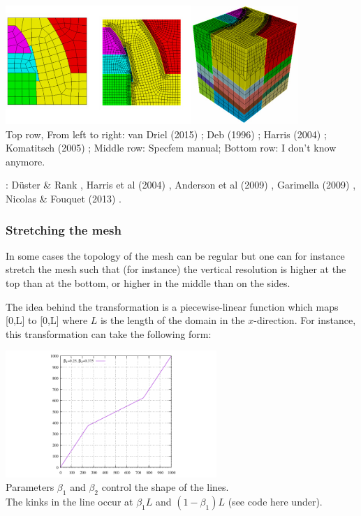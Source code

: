 \begin{center}
\includegraphics[height=4.5cm]{images/meshes/conf3D}\\
{\captionfont 
Top row, From left to right: 
van Driel \etal (2015) \cite{vaks15}; 
Deb \etal (1996) \cite{depl96}; 
Harris \etal (2004) \cite{habo04}; 
Komatitsch \etal (2005) \cite{kott05}; 
Middle row: Specfem manual;
Bottom row: I don't know anymore.}
\end{center}

\Literature: 
D{\"u}ster \& Rank \cite{dura01},
Harris et al (2004) \cite{habo04},
Anderson et al (2009) \cite{anbo09},
Garimella (2009) \cite{gari09},
Nicolas \& Fouquet (2013) \cite{nifo13,nifo13b}.

\subsubsection{Stretching the mesh}

In some cases the topology of the mesh can be regular but one can for instance stretch 
the mesh such that (for instance) the vertical resolution is higher at the top than at the bottom, 
or higher in the middle than on the sides.

The idea behind the transformation is a piecewise-linear function which maps [0,L] to [0,L] where 
$L$ is the length of the domain in the $x$-direction. For instance, this transformation can take the following form:

\begin{center}
\includegraphics[width=8cm]{images/meshes/stretching/stretch_towards_center}\\
{\captionfont Parameters $\beta_1$ and $\beta_2$ control the shape of the lines.\\ 
The kinks in the line occur at $\beta_1 L$ and $(1-\beta_1)L$ (see code here under).}
\end{center}

